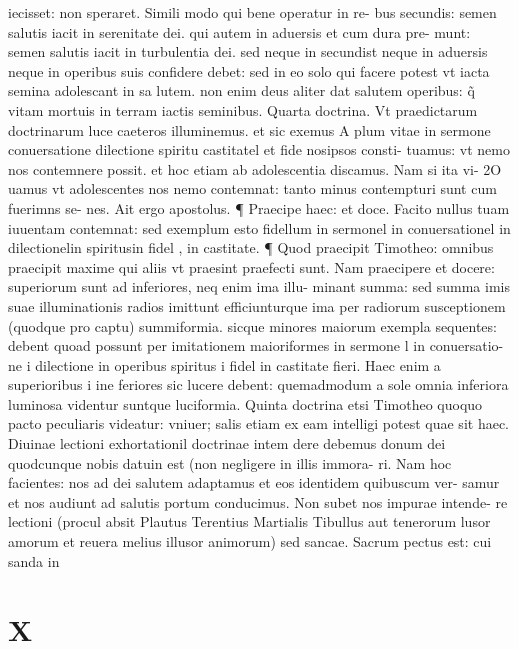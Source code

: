 \documentclass{article}
\begin{document}
\begin{pages}
iecisset: non speraret. Simili modo qui bene operatur in re- bus secundis: semen salutis iacit in serenitate dei. qui autem in aduersis et cum dura pre- munt: semen salutis iacit in turbulentia dei. sed neque in secundist neque in aduersis neque in operibus suis confidere debet: sed in eo solo qui facere potest vt iacta semina adolescant in sa lutem. non enim deus aliter dat salutem operibus: q̃ vitam mortuis in terram iactis seminibus. Quarta doctrina. Vt praedictarum doctrinarum luce caeteros illuminemus. et sic exemus A plum vitae in sermone conuersatione dilectione spiritu castitatel et fide nosipsos consti- tuamus: vt nemo nos contemnere possit. et hoc etiam ab adolescentia discamus. Nam si ita vi- 2O uamus vt adolescentes nos nemo contemnat: tanto minus contempturi sunt cum fuerimns se-  nes. Ait ergo apostolus. ¶ Praecipe haec: et doce. Facito nullus tuam iuuentam contemnat:  sed exemplum esto fidellum in sermonel in conuersationel in dilectionelin spiritusin fidel , in castitate. ¶ Quod praecipit Timotheo: omnibus praecipit maxime qui aliis vt praesint praefecti sunt. Nam praecipere et docere: superiorum sunt ad inferiores, neq enim ima illu- minant summa: sed summa imis suae illuminationis radios imittunt efficiunturque ima per radiorum susceptionem (quodque pro captu) summiformia. sicque minores maiorum exempla sequentes: debent quoad possunt per imitationem maioriformes in sermone l in conuersatio- ne i dilectione in operibus spiritus i fidel in castitate fieri. Haec enim a superioribus i ine feriores sic lucere debent: quemadmodum a sole omnia inferiora luminosa videntur suntque  luciformia. Quinta doctrina etsi Timotheo quoquo pacto peculiaris videatur: vniuer; salis etiam ex eam intelligi potest quae sit haec. Diuinae lectioni exhortationil doctrinae intem dere debemus donum dei quodcunque nobis datuin est (non negligere in illis immora- ri. Nam hoc facientes: nos ad dei salutem adaptamus et eos identidem quibuscum ver- samur et nos audiunt ad salutis portum conducimus. Non subet nos impurae intende- re lectioni (procul absit Plautus Terentius Martialis Tibullus aut tenerorum lusor amorum et reuera melius illusor animorum) sed sancae. Sacrum pectus est: cui sanda in  \pend
\section*{X }

\end{pages}
\end{document}
